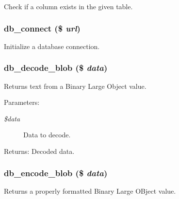 Check if a column exists in the given table. \hypertarget{database_8mysql_8inc_bc9960ee403664deae1c219015dc5ff2}{
\subsubsection[{db\_\-connect}]{\setlength{\rightskip}{0pt plus 5cm}db\_\-connect (\$ {\em url})}}
\label{database_8mysql_8inc_bc9960ee403664deae1c219015dc5ff2}


Initialize a database connection. \hypertarget{database_8mysql_8inc_1ed4215d202290ca055de8f6cf3b6f08}{
\subsubsection[{db\_\-decode\_\-blob}]{\setlength{\rightskip}{0pt plus 5cm}db\_\-decode\_\-blob (\$ {\em data})}}
\label{database_8mysql_8inc_1ed4215d202290ca055de8f6cf3b6f08}


Returns text from a Binary Large Object value.

\begin{Desc}
\item[Parameters:]
\begin{description}
\item[{\em \$data}]Data to decode. \end{description}
\end{Desc}
\begin{Desc}
\item[Returns:]Decoded data. \end{Desc}
\hypertarget{database_8mysql_8inc_464ab7b26ecfdddc68f3564ca609ac3f}{
\subsubsection[{db\_\-encode\_\-blob}]{\setlength{\rightskip}{0pt plus 5cm}db\_\-encode\_\-blob (\$ {\em data})}}
\label{database_8mysql_8inc_464ab7b26ecfdddc68f3564ca609ac3f}


Returns a properly formatted Binary Large OBject value.

